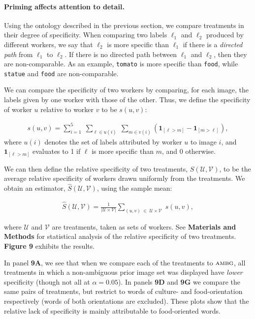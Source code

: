 \documentclass[a4paper]{report}
\begin{document}
\paragraph{Priming affects attention to detail.} Using the ontology described
in the previous section, we compare treatments in their degree of specificity.
When comparing two labels $\ell_1$ and $\ell_2$ produced by different workers,
we say that $\ell_2$ is more specific than $\ell_1$ if there is a 
\textit{directed path} from $\ell_1$ to $\ell_2$.  If there is no directed path
between $\ell_1$ and $\ell_2$, then they are non-comparable.  As an example,
\texttt{tomato} is more specific than \texttt{food}, while \texttt{statue}
and \texttt{food} are non-comparable.

We can compare the specificity of two workers by comparing, for each image,
the labels given by one worker with those of the other.  Thus, we define the
specificity of worker $u$ relative to worker $v$ to be $s(u,v)$:

\begin{align}
	s(u,v) = \sum_{i=1}^5 \;
	\sum_{\ell \in u(i) } \;
	\sum_{m \in v(i)} 
	\left(\mathbf{1}_{[\ell > m]} - \mathbf{1}_{[m>\ell]}\right),
	\label{eq:worker-specificity}
\end{align}
where $u(i)$ denotes the set of labels attributed by worker $u$ to image $i$, 
and $\mathbf{1}_{[\ell > m]}$ evaluates to 1 if $\ell$ is more specific than 
$m$, and 0 otherwise.

We can then define the relative specificity of two treatments, 
$S(\mathcal{U},\mathcal{V})$, to be the average
relative specificity of workers drawn uniformly from the treatments.  
We obtain an estimator, $\hat{S}({\mathcal{U}, \mathcal{V}})$, using the 
sample mean:

\begin{align}
	\hat{S}(\mathcal{U},\mathcal{V}) = 
	\frac{1}{|\mathcal{U} \times \mathcal{V}|}
	\sum_{(u,v) \; \in \; \mathcal{U} \times \mathcal{V}} \;
		s(u,v),
		\label{eq:specificity}
\end{align}

where $\mathcal{U}$ and $\mathcal{V}$ are treatments, taken as sets of workers.
See \textbf{Materials and Methods} for statistical analysis of the relative 
specificity of two treatments. 
\textbf{Figure 9} 
exhibits the results.

In panel \textbf{9A}, we see that when we compare each of the treatments to
$\textsc{ambg}$, all treatments in which a non-ambiguous prior image set was 
displayed have \textit{lower} specificity (though not all at $\alpha=0.05$).  
In panels \textbf{9D} and \textbf{9G} we compare the same pairs of treatments, 
but restrict to words of culture- and food-orientation respectively (words
of both orientations are excluded).  These plots show that the relative lack 
of specificity is mainly attributable to food-oriented words.  
\end{document}
